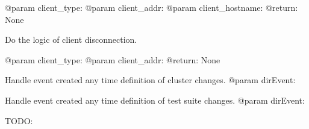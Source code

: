 \documentclass[letterpaper,10pt,english]{sphinxmanual}
\begin{document}
\begin{fulllineitems}
\begin{fulllineitems}
@param client\_type:
@param client\_addr:
@param client\_hostname:
@return: None

\end{fulllineitems}


\begin{fulllineitems}
\label{ref-manual/XrdTestMaster:XrdTestMaster.XrdTestMaster.handleClientDisconnected}
Do the logic of client disconnection.

@param client\_type:
@param client\_addr:
@return: None

\end{fulllineitems}


\begin{fulllineitems}
\label{ref-manual/XrdTestMaster:XrdTestMaster.XrdTestMaster.handleClusterDefinitionChanged}
Handle event created any time definition of cluster changes.
@param dirEvent:

\end{fulllineitems}


\begin{fulllineitems}
\label{ref-manual/XrdTestMaster:XrdTestMaster.XrdTestMaster.handleSuiteDefinitionChanged}
Handle event created any time definition of test suite changes.
@param dirEvent:

\end{fulllineitems}


\begin{fulllineitems}
\label{ref-manual/XrdTestMaster:XrdTestMaster.XrdTestMaster.handleTagRequest}
TODO:

\end{fulllineitems}



\end{fulllineitems}
\end{document}
